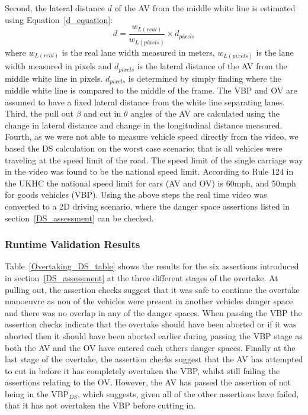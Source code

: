 Second, the lateral distance $d$ of the AV from the middle white line is estimated using Equation~\ref{d_equation}: 
%
\begin{equation}\label{d_equation}
    d = \frac{w_{L (real)}}{w_{L (pixels)}} \times d_{pixels}
\end{equation}
%
where $w_{L (real)}$ is the real lane width measured in meters, $w_{L (pixels)}$ is the lane width measured in pixels and $d_{pixels}$ is the lateral distance of the AV from the middle white line in pixels. $d_{pixels}$ is determined by simply finding where the middle white line is compared to the middle of the frame. The VBP and OV are assumed to have a fixed lateral distance from the white line separating lanes. Third, the pull out $\beta$ and cut in $\theta$ angles of the AV are calculated using the change in lateral distance and change in the longitudinal distance measured. Fourth, as we were not able to measure vehicle speed directly from the video, we based the DS calculation on the worst case scenario; that is all vehicles were traveling at the speed limit of the road. The speed limit of the single carriage way in the video was found to be the national speed limit. According to Rule 124 in the UKHC the national speed limit for cars (AV and OV) is 60mph, and 50mph for goods vehicles (VBP). Using the above steps the real time video was converted to a 2D driving scenario, where the danger space assertions listed in section~\ref{DS_assessment} can be checked.

\subsubsection{Runtime Validation Results}
Table~\ref{Overtaking_DS_table} shows the results for the six assertions introduced in section~\ref{DS_assessment} at the three different stages of the overtake. At pulling out, the assertion checks suggest that it was safe to continue the overtake manoeuvre as non of the vehicles were present in another vehicles danger space and there was no overlap in any of the danger spaces. 
When passing the VBP the assertion checks indicate that the overtake should have been aborted or if it was aborted then it should have been aborted earlier during passing the VBP stage as both the AV and the OV have entered each others danger spaces. Finally at the last stage of the overtake, the assertion checks suggest that the AV has attempted to cut in before it has completely overtaken the VBP, whilst still failing the assertions relating to the OV. However, the AV has passed the assertion of not being in the VBP$_{DS}$, which suggests, given all of the other assertions have failed, that it has not overtaken the VBP before cutting in.

